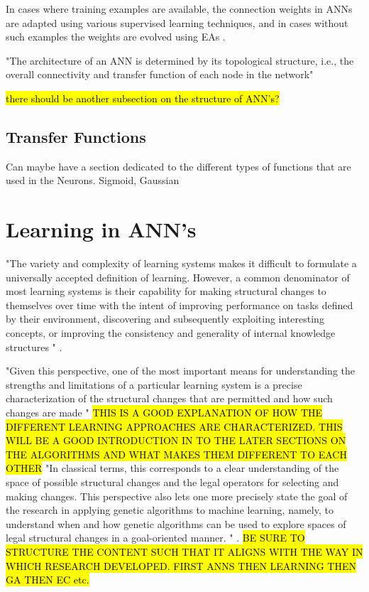In cases where training examples are available, the connection weights in ANNs are adapted using various supervised learning techniques, and in cases without such examples the weights are evolved using EAs \cite{dayhoff2001artificial,RefWorks:1}.


"The architecture of an ANN is determined by its topological structure, i.e., the overall connectivity and transfer function of each node in the network" \cite{XinYao1999}

\hl{there should be another subsection on the structure of ANN's?}

\subsection{Transfer Functions}
Can maybe have a section dedicated to the different types of functions that are used in the Neurons.
Sigmoid, Gaussian


\section{Learning in ANN's}

"The variety and complexity of learning systems makes it difficult to formulate a universally accepted definition of learning. However, a common denominator of most learning systems is their capability for making structural changes to themselves over time with the intent of improving performance on tasks defined by their environment, discovering and subsequently exploiting interesting concepts, or improving the consistency and generality of internal knowledge structures " \cite{de1988learning}.

"Given this perspective, one of the most important means for understanding the strengths and limitations of a particular learning system is a precise characterization of the structural changes that are permitted and how such changes are made " \cite{de1988learning} \hl{THIS IS A GOOD EXPLANATION OF HOW THE DIFFERENT LEARNING APPROACHES ARE CHARACTERIZED. THIS WILL BE A GOOD INTRODUCTION IN TO THE LATER SECTIONS ON THE ALGORITHMS AND WHAT MAKES THEM DIFFERENT TO EACH OTHER}
"In classical terms, this corresponds to a clear understanding of the space of possible structural changes and the legal operators for selecting and making changes. This perspective also lets one more precisely state the goal of the research in applying genetic algorithms to machine learning, namely, to understand when and how genetic algorithms can be used to explore spaces of legal structural changes in a goal-oriented manner. " \cite{de1988learning}.
\hl{BE SURE TO STRUCTURE THE CONTENT SUCH THAT IT ALIGNS WITH THE WAY IN WHICH RESEARCH DEVELOPED. FIRST ANNS THEN LEARNING THEN GA THEN EC etc.}




